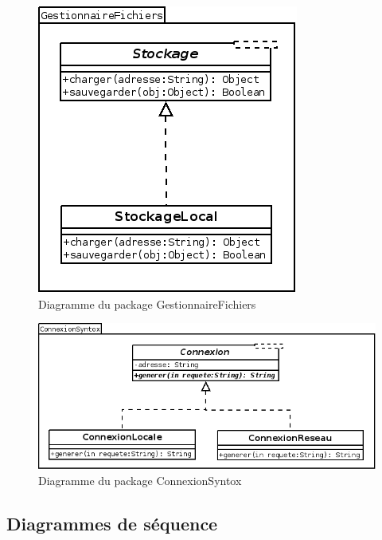 \documentclass[12pt]{report}
\begin{document}
\begin{figure}[h!]
\begin{center}
\includegraphics[scale=0.5]{DiagStockage.png}
\caption{Diagramme du package GestionnaireFichiers}
\end{center}
\end{figure}


\begin{figure}[h!]
\begin{center}
\includegraphics[scale=0.5]{DiagSyntox.png}
\caption{Diagramme du package ConnexionSyntox}
\end{center}
\end{figure}

\FloatBarrier

\subsection{Diagrammes de séquence}
\end{document}

